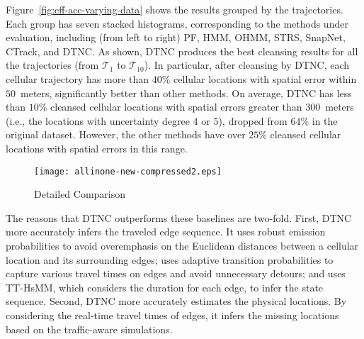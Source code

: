 \documentclass{vldb}
\begin{document}
	Figure~\ref{fig:eff-acc-varying-data} shows the results 
	grouped by the trajectories. Each group has seven stacked histograms, corresponding to the methods under evaluation, including (from left to right) PF, HMM, OHMM, STRS, SnapNet,  CTrack, and DTNC.
	As shown, DTNC produces the best cleansing results for all the trajectories (from $\mathcal{T}_1$ to $\mathcal{T}_{10}$).
	In particular, after cleansing by DTNC, each cellular trajectory has more than $40\%$ cellular locations with spatial error within $50$~meters, significantly better than other methods.
	On average, DTNC has less than $10\%$ cleansed cellular locations with spatial errors greater than $300$~meters (i.e., the locations with uncertainty degree $4$ or $5$), dropped from $64\%$ in the original dataset. 
	However, the other methods have over $25\%$ cleansed cellular locations with spatial errors in this range.
	
	\begin{figure*}[!htbp]
		\centering
		\vspace{-5pt}
		\texttt{[image: allinone-new-compressed2.eps]}
		\caption{Detailed Comparison}	
		\vspace{-15pt}
		\label{fig:eff-detail}
	\end{figure*}
	
	The reasons that DTNC outperforms these baselines are two-fold.
	First, DTNC more accurately infers the traveled edge sequence. %
	It uses robust emission probabilities to avoid overemphasis on the Euclidean distances between a cellular location and its surrounding edges; uses adaptive transition probabilities to capture various travel times on edges and avoid unnecessary detours; and uses TT-HsMM, which considers the duration for each edge, to infer the state sequence. %
	Second, DTNC more accurately estimates the physical locations. %
	By considering the real-time travel times of edges, it infers the missing locations based on the traffic-aware simulations.
		
\end{document}
